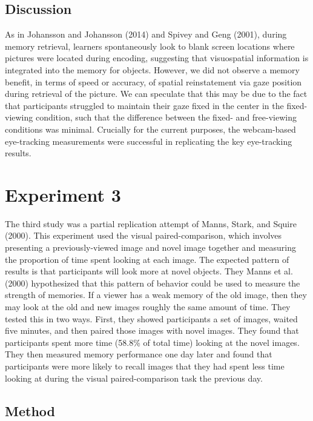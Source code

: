 \documentclass[
  man,floatsintext]{apa6}
\begin{document}
\subsection{Discussion}\label{discussion-1}

As in Johansson and Johansson (2014) and Spivey and Geng (2001), during memory retrieval, learners spontaneously look to blank screen locations where pictures were located
during encoding, suggesting that visuospatial information is integrated into the memory
for objects. However, we did not observe a memory benefit, in terms of speed or accuracy, of spatial reinstatement via gaze position during retrieval of the picture. We can speculate that this may be due to the fact that participants struggled to maintain their gaze fixed in the center in the fixed-viewing condition, such that the difference between the fixed- and free-viewing conditions was minimal. Crucially for the current purposes, the webcam-based eye-tracking measurements were successful in replicating the key eye-tracking results.

\section{Experiment 3}\label{experiment-3}

The third study was a partial replication attempt of
Manns, Stark, and Squire (2000). This experiment used the visual
paired-comparison, which involves presenting a previously-viewed image
and novel image together and measuring the proportion of time spent
looking at each image. The expected pattern of results is that
participants will look more at novel objects. They
Manns et al. (2000) hypothesized that this pattern of
behavior could be used to measure the strength of memories. If a viewer
has a weak memory of the old image, then they may look at the old and
new images roughly the same amount of time. They tested this in two
ways. First, they showed participants a set of images, waited five
minutes, and then paired those images with novel images. They found that
participants spent more time (58.8\% of total time) looking at the novel
images. They then measured memory performance one day later and found
that participants were more likely to recall images that they had spent
less time looking at during the visual paired-comparison task the
previous day.

\subsection{Method}\label{method-2}
\end{document}
